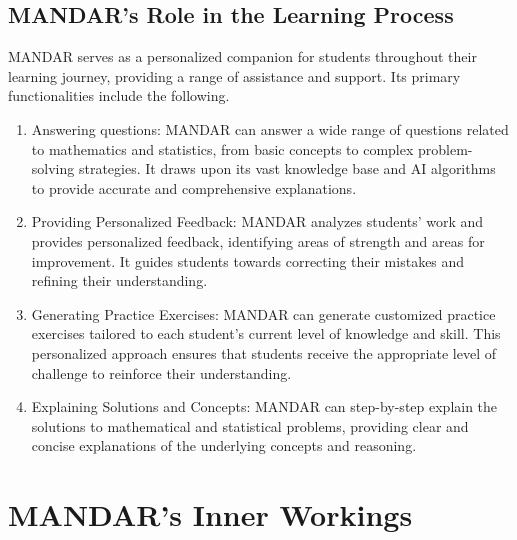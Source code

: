 \documentclass[20pt]{report}
\begin{document}
\subsection{MANDAR's Role in the Learning Process}

MANDAR serves as a personalized companion for students throughout their learning journey, providing a range of assistance and support. Its primary functionalities include the following.

\begin{enumerate}

\item Answering questions: MANDAR can answer a wide range of questions related to mathematics and statistics, from basic concepts to complex problem-solving strategies. It draws upon its vast knowledge base and AI algorithms to provide accurate and comprehensive explanations.

\item Providing Personalized Feedback: MANDAR analyzes students' work and provides personalized feedback, identifying areas of strength and areas for improvement. It guides students towards correcting their mistakes and refining their understanding.

\item Generating Practice Exercises: MANDAR can generate customized practice exercises tailored to each student's current level of knowledge and skill. This personalized approach ensures that students receive the appropriate level of challenge to reinforce their understanding.

\item Explaining Solutions and Concepts: MANDAR can step-by-step explain the solutions to mathematical and statistical problems, providing clear and concise explanations of the underlying concepts and reasoning.

\end{enumerate}

\section{MANDAR's Inner Workings}
\end{document}
